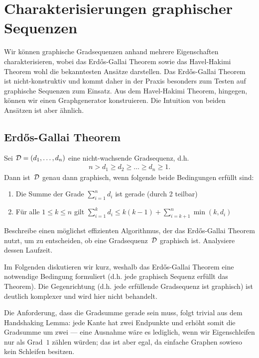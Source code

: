 \section{Charakterisierungen graphischer Sequenzen}
Wir können graphische Gradsequenzen anhand mehrere Eigenschaften charakterisieren, wobei das Erd\H{o}s-Gallai Theorem sowie das Havel-Hakimi Theorem wohl die bekanntesten Ansätze darstellen.
Das Erd\H{o}s-Gallai Theorem ist nicht-konstruktiv und kommt daher in der Praxis besonders zum Testen auf graphische Sequenzen zum Einsatz.
Aus dem Havel-Hakimi Theorem, hingegen, können wir einen Graphgenerator konstruieren.
Die Intuition von beiden Ansätzen ist aber ähnlich.

\subsection{Erd\H{o}s-Gallai Theorem}
\begin{theorem}
    Sei $\mathcal{D} = (d_1, \ldots, d_n)$ eine nicht-wachsende Gradsequenz, d.h.
    \begin{align}
        n > d_1 \ge d_2 \ge \ldots \ge d_n \ge 1.
    \end{align}
    Dann ist~$\mathcal{D}$ genau dann graphisch, wenn folgende beide Bedingungen erfüllt sind:
    \begin{enumerate}
        \item Die Summe der Grade $\sum_{i=1}^n d_i$ ist gerade (durch 2 teilbar)
        \item Für alle $1 \le k \le n$ gilt $\sum_{i=1}^k d_i \le k(k-1) + \sum_{i=k+1}^n \min(k, d_i)$\hfill\qedhere
    \end{enumerate}
\end{theorem}

\begin{exercise}
    Beschreibe einen möglichst effizienten Algorithmus, der das Erd\H{o}s-Gallai Theorem nutzt, um zu entscheiden, ob eine Gradsequenz~$\mathcal{D}$ graphisch ist.
    Analysiere dessen Laufzeit.
\end{exercise}

Im Folgenden diskutieren wir kurz, weshalb das Erd\H{o}s-Gallai Theorem eine notwendige Bedingung formuliert (d.h. jede graphisch Sequenz erfüllt das Theorem).
Die Gegenrichtung (d.h. jede erfüllende Gradsequenz ist graphisch) ist deutlich komplexer und wird hier nicht behandelt.

Die Anforderung, dass die Gradsumme gerade sein muss, folgt trivial aus dem Handshaking Lemma:
jede Kante hat zwei Endpunkte und erhöht somit die Gradsumme um zwei
--- eine Ausnahme wäre es lediglich, wenn wir Eigenschleifen nur als Grad~$1$ zählen würden; das ist aber egal, da einfache Graphen sowieso kein Schleifen besitzen.

